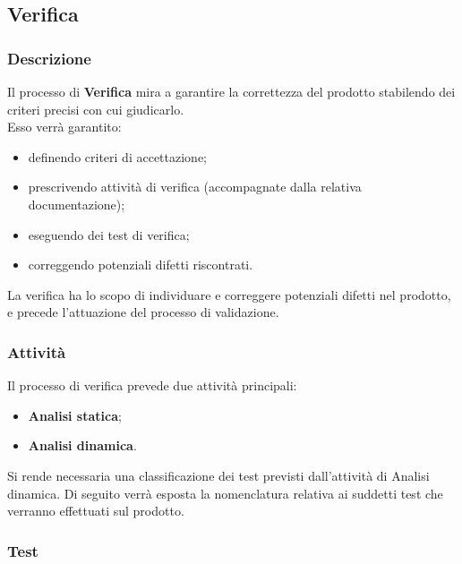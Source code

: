 \subsection{Verifica}
		\subsubsection{Descrizione}
		Il processo di \textbf{Verifica} mira a garantire la correttezza del prodotto stabilendo dei criteri precisi con cui giudicarlo. \\ Esso verrà garantito:
		\begin{itemize}
			\item definendo criteri di accettazione;
			\item prescrivendo attività di verifica (accompagnate dalla relativa documentazione);
			\item eseguendo dei test di verifica;
			\item correggendo potenziali difetti riscontrati.
		\end{itemize}
		La verifica ha lo scopo di individuare e correggere potenziali difetti nel prodotto, e precede l'attuazione del processo di validazione.
		
		\subsubsection{Attività}
		Il processo di verifica prevede due attività principali:
		\begin{itemize}
			\item \textbf{Analisi statica};
			\item \textbf{Analisi dinamica}.
		\end{itemize}
		
		Si rende necessaria una classificazione dei test previsti dall'attività di Analisi dinamica. Di seguito verrà esposta la nomenclatura relativa ai suddetti test che verranno effettuati sul prodotto.
		
		\subsubsection{Test}
		
